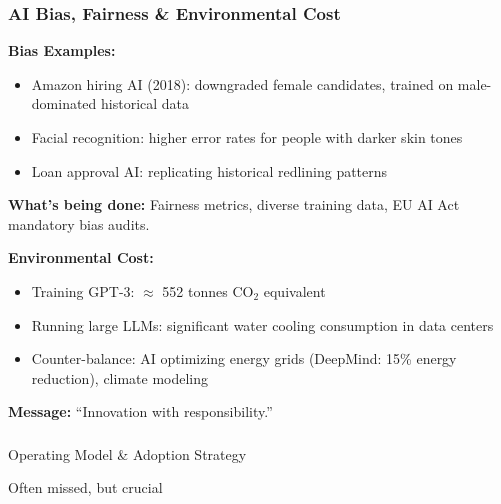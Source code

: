 \begin{frame}[fragile]\frametitle{AI Bias, Fairness \& Environmental Cost}
\textbf{Bias Examples:}
\begin{itemize}
\item Amazon hiring AI (2018): downgraded female candidates, trained on male-dominated historical data
\item Facial recognition: higher error rates for people with darker skin tones
\item Loan approval AI: replicating historical redlining patterns
\end{itemize}

\textbf{What's being done:} Fairness metrics, diverse training data, EU AI Act mandatory bias audits.

\vspace{0.5em}
\textbf{Environmental Cost:}
\begin{itemize}
\item Training GPT-3: $\approx$ 552 tonnes $\text{CO}_2$ equivalent
\item Running large LLMs: significant water cooling consumption in data centers
\item Counter-balance: AI optimizing energy grids (DeepMind: 15\% energy reduction), climate modeling
\end{itemize}
\textbf{Message:} ``Innovation with responsibility.''
\end{frame}


\begin{frame}[fragile]\frametitle{}
\begin{center}
{\Large Operating Model \& Adoption Strategy}

{\small Often missed, but crucial}
\end{center}
\end{frame}

